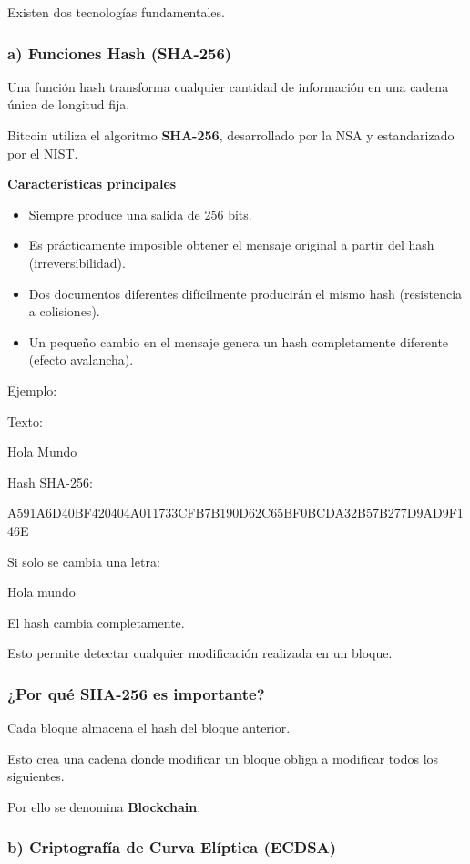 \documentclass[12pt,a4paper]{article}
\begin{document}
Existen dos tecnologías fundamentales.

\subsubsection*{a) Funciones Hash (SHA-256)}

Una función hash transforma cualquier cantidad de información en una cadena única de longitud fija.

Bitcoin utiliza el algoritmo \textbf{SHA-256}, desarrollado por la NSA y estandarizado por el NIST.

\textbf{Características principales}

\begin{itemize}
  \item Siempre produce una salida de 256 bits.
  \item Es prácticamente imposible obtener el mensaje original a partir del hash (irreversibilidad).
  \item Dos documentos diferentes difícilmente producirán el mismo hash (resistencia a colisiones).
  \item Un pequeño cambio en el mensaje genera un hash completamente diferente (efecto avalancha).
\end{itemize}

Ejemplo:

Texto:

Hola Mundo

Hash SHA-256:

A591A6D40BF420404A011733CFB7B190D62C65BF0BCDA32B57B277D9AD9F146E

Si solo se cambia una letra:

Hola mundo

El hash cambia completamente.

Esto permite detectar cualquier modificación realizada en un bloque.

\subsubsection*{¿Por qué SHA-256 es importante?}

Cada bloque almacena el hash del bloque anterior.

Esto crea una cadena donde modificar un bloque obliga a modificar todos los siguientes.

Por ello se denomina \textbf{Blockchain}.

\subsubsection*{b) Criptografía de Curva Elíptica (ECDSA)}
\end{document}
